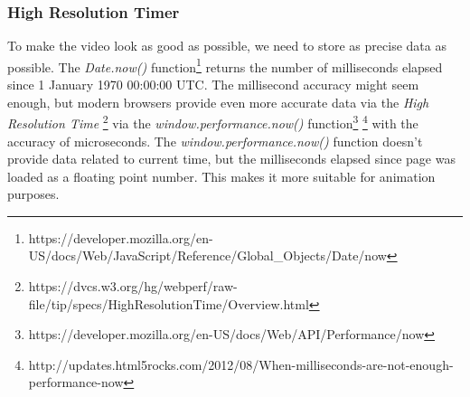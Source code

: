 \subsubsection{High Resolution Timer}
To make the video look as good as possible, we need to store as precise data as possible. The \textit{Date.now()} function\footnote{https://developer.mozilla.org/en-US/docs/Web/JavaScript/Reference/Global\_Objects/Date/now} returns the number of milliseconds elapsed since 1 January 1970 00:00:00 UTC. The millisecond accuracy might seem enough, but modern browsers provide even more accurate data via the \textit{High Resolution Time} \footnote{https://dvcs.w3.org/hg/webperf/raw-file/tip/specs/HighResolutionTime/Overview.html} via the \textit{window.performance.now()} function\footnote{https://developer.mozilla.org/en-US/docs/Web/API/Performance/now} \footnote{http://updates.html5rocks.com/2012/08/When-milliseconds-are-not-enough-performance-now} with the accuracy of microseconds. The \textit{window.performance.now()} function doesn't provide data related to current time, but the milliseconds elapsed since page was loaded as a floating point number. This makes it more suitable for animation purposes.

